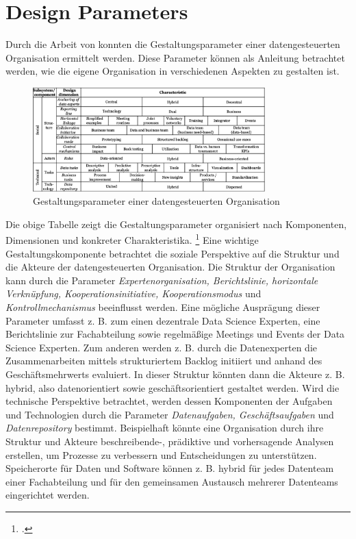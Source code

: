 \section{Design Parameters}

Durch die Arbeit von  konnten die Gestaltungsparameter einer datengesteuerten Organisation ermittelt werden.
Diese Parameter können als Anleitung betrachtet werden, wie die eigene Organisation in verschiedenen Aspekten zu gestalten ist.

\begin{figure}[htb]
    \centering
    \includegraphics[width=0.8\textwidth]{graphics/DDO_design.png}
    \caption{Gestaltungsparameter einer datengesteuerten Organisation}
    \label{fig:DDOs design}
\end{figure}

Die obige Tabelle zeigt die Gestaltungsparameter organisiert nach Komponenten, Dimensionen und konkreter Charakteristika. \footcite[Vgl.][S. 5]{JanineAdinaHagen.2020}
Eine wichtige Gestaltungskomponente betrachtet die soziale Perspektive auf die Struktur und die Akteure der datengesteuerten Organisation.
Die Struktur der Organisation kann durch die Parameter \textit{Expertenorganisation, Berichtslinie, horizontale Verknüpfung, Kooperationsinitiative, Kooperationsmodus} und \textit{Kontrollmechanismus} beeinflusst werden.
Eine mögliche Ausprägung dieser Parameter umfasst z. B. zum einen dezentrale Data Science Experten, eine Berichtslinie zur Fachabteilung sowie regelmäßige Meetings und Events der Data Science Experten.
Zum anderen werden z. B. durch die Datenexperten die Zusammenarbeiten mittels strukturiertem Backlog initiiert und anhand des Geschäftsmehrwerts evaluiert.
In dieser Struktur könnten dann die Akteure z. B. hybrid, also datenorientiert sowie geschäftsorientiert gestaltet werden.
Wird die technische Perspektive betrachtet, werden dessen Komponenten der Aufgaben und Technologien durch die Parameter \textit{Datenaufgaben, Geschäftsaufgaben} und \textit{Datenrepository} bestimmt.
Beispielhaft könnte eine Organisation durch ihre Struktur und Akteure beschreibende-, prädiktive und vorhersagende Analysen erstellen, um Prozesse zu verbessern und Entscheidungen zu unterstützen.
Speicherorte für Daten und Software können z. B. hybrid für jedes Datenteam einer Fachabteilung und für den gemeinsamen Austausch mehrerer Datenteams eingerichtet werden.

